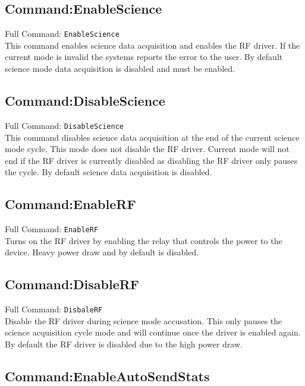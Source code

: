 \subsection{Command:EnableScience}

Full Command: \texttt{EnableScience}\\

This command enables science data acquisition and enables the RF driver. If the current mode is invalid the systems reports the error to the user. By default science mode data acquisition is disabled and must be enabled.

\subsection{Command:DisableScience}

Full Command: \texttt{DisableScience}\\

This command disables science data acquisition at the end of the current science mode cycle. This mode does not disable the RF driver. Current mode will not end if the RF driver is currently disabled as disabling the RF driver only pauses the cycle. By default science data acquisition is disabled.

\subsection{Command:EnableRF}

Full Command: \texttt{EnableRF}\\

Turns on the RF driver by enabling the relay that controls the power to the device. Heavy power draw and by default is disabled.

\subsection{Command:DisableRF}

Full Command: \texttt{DisbaleRF}\\

Disable the RF driver during science mode accusation. This only pauses the science acquisition cycle mode and will continue once the driver is enabled again. By default the RF driver is disabled due to the high power draw.

\subsection{Command:EnableAutoSendStats}

